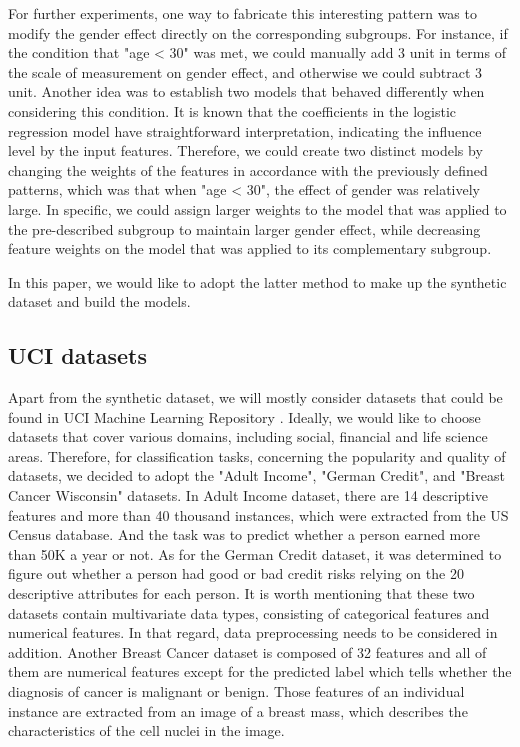For further experiments, one way to fabricate this interesting pattern was to modify the gender effect directly on the corresponding subgroups. For instance, if the condition that "age < 30" was met, we could manually add 3 unit in terms of the scale of measurement on gender effect, and otherwise we could subtract 3 unit. Another idea was to establish two models that behaved differently when considering this condition. It is known that the coefficients in the logistic regression model have straightforward interpretation, indicating the influence level by the input features. Therefore, we could create two distinct models by changing the weights of the features in accordance with the previously defined patterns, which was that when "age < 30", the effect of gender was relatively large. In specific, we could assign larger weights to the model that was applied to the pre-described subgroup to maintain larger gender effect, while decreasing feature weights on the model that was applied to its complementary subgroup.

In this paper, we would like to adopt the latter method to make up the synthetic dataset and build the models. 

\subsection{UCI datasets}

Apart from the synthetic dataset, we will mostly consider datasets that could be found in UCI Machine Learning Repository \cite{asuncion2007uci}\cite{Dua:2019}. Ideally, we would like to choose datasets that cover various domains, including social, financial and life science areas. Therefore, for classification tasks, concerning the popularity and quality of datasets, we decided to adopt the "Adult Income", "German Credit", and "Breast Cancer Wisconsin" datasets. In Adult Income dataset, there are 14 descriptive features and more than 40 thousand instances, which were extracted from the US Census database. And the task was to predict whether a person earned more than 50K a year or not. As for the German Credit dataset, it was determined to figure out whether a person had good or bad credit risks relying on the 20 descriptive attributes for each person. It is worth mentioning that these two datasets contain multivariate data types, consisting of categorical features and numerical features. In that regard, data preprocessing needs to be considered in addition. Another Breast Cancer dataset is composed of 32 features and all of them are numerical features except for the predicted label which tells whether the diagnosis of cancer is malignant or benign. Those features of an individual instance are extracted from an image of a breast mass, which describes the characteristics of the cell nuclei in the image. 

